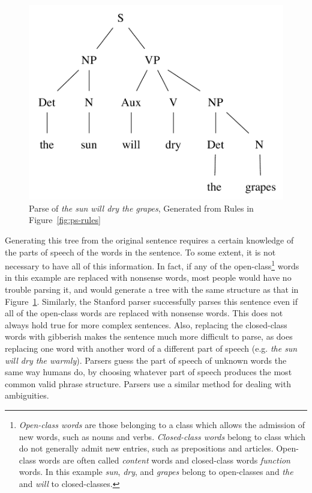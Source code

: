 \documentclass[main.tex]{subfiles}
\begin{document}
\begin{figure}[htbp]
\centering
\includegraphics[scale=0.6]{ps-tree.pdf}
\caption[Parse of \textit{the sun will dry the grapes}]{Parse of \textit{the sun will dry the grapes}, Generated from Rules in Figure~\ref{fig:ps-rules}}
\label{fig:ps-tree}
\end{figure}
Generating this tree from the original sentence requires a certain knowledge of the parts of speech of the words in the sentence. To some extent, it is not necessary to have all of this information. In fact, if any of the open-class\footnote{\textit{Open-class words} are those belonging to a class which allows the admission of new words, such as nouns and verbs. \textit{Closed-class words} belong to class which do not generally admit new entries, such as prepositions and articles. Open-class words are often called \textit{content} words and closed-class words \textit{function} words. In this example \textit{sun}, \textit{dry}, and \textit{grapes} belong to open-classes and \textit{the} and \textit{will} to closed-classes.} words in this example are replaced with nonsense words, most people would have no trouble parsing it, and would generate a tree with the same structure as that in Figure~\ref{fig:ps-tree}. Similarly, the Stanford parser successfully parses this sentence even if all of the open-class words are replaced with nonsense words. This does not always hold true for more complex sentences. Also, replacing the closed-class words with gibberish makes the sentence much more difficult to parse, as does replacing one word with another word of a different part of speech (e.g. \textit{the sun will dry the warmly}). Parsers guess the part of speech of unknown words the same way humans do, by choosing whatever part of speech produces the most common valid phrase structure. Parsers use a similar method for dealing with ambiguities.
\end{document}
